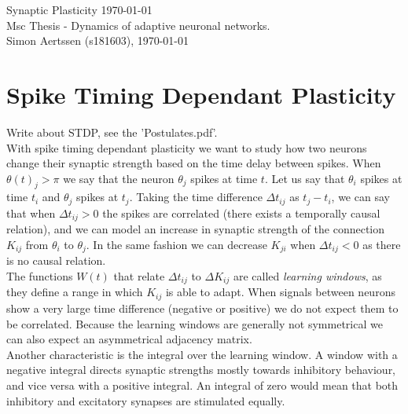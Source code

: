


\mainmatter

Synaptic Plasticity \today \\
Msc Thesis - Dynamics of adaptive neuronal networks. \\
Simon Aertssen (s181603), \today \\ 

\section{Spike Timing Dependant Plasticity}
Write about STDP, see the 'Postulates.pdf'. \\

With spike timing dependant plasticity we want to study how two neurons change their synaptic strength based on the time delay between spikes. When $\theta(t)_j > \pi$ we say that the neuron $\theta_j$ spikes at time $t$. 
Let us say that $\theta_i$ spikes at time $t_i$ and $\theta_j$ spikes at $t_j$. Taking the time difference $\Delta t_{ij}$ as $t_j - t_i$, we can say that when $\Delta t_{ij} > 0$ the spikes are correlated (there exists a temporally causal relation), and we can model an increase in synaptic strength of the connection $K_{ij}$ from $\theta_i$ to $\theta_j$. In the same fashion we can decrease $K_{ji}$ when $\Delta t_{ij} < 0$ as there is no causal relation. \\
The functions $W(t)$ that relate $\Delta t_{ij}$ to $\Delta K_{ij}$ are called \textsl{learning windows},  as they define a range in which $K_{ij}$ is able to adapt. When signals between neurons show a very large time difference (negative or positive) we do not expect them to be correlated. Because the learning windows are generally not symmetrical we can also expect an asymmetrical adjacency matrix.\\
Another characteristic is the integral over the learning window. A window with a negative integral directs synaptic strengths mostly towards inhibitory behaviour, and vice versa with a positive integral. An integral of zero would mean that both inhibitory and excitatory synapses are stimulated equally.\\



